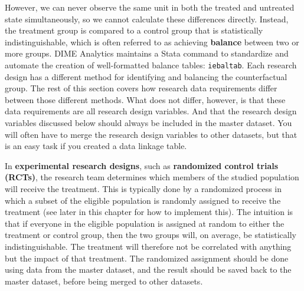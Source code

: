 However, we can never observe the same unit
in both the treated and untreated state simultaneously,
so we cannot calculate these differences directly.
Instead, the treatment group is compared to a control group
that is statistically indistinguishable,
which is often referred to as achieving
\textbf{balance} between two or more groups.
DIME Analytics maintains a Stata command to
standardize and automate the creation of well-formatted balance tables:
\texttt{iebaltab}.
Each research design has a different method for
identifying and balancing the counterfactual group.
The rest of this section covers how research data requirements
differ between those different methods.
What does not differ, however,
is that these data requirements are all research design variables.
And that the research design variables discussed below
should always be included in the master dataset.
You will often have to merge
the research design variables to other datasets,
but that is an easy task
if you created a data linkage table.


In \textbf{experimental research designs},
such as \textbf{randomized control trials (RCTs)},
the research team determines which members
of the studied population will receive the treatment.
This is typically done by a randomized process
in which a subset of the eligible population
is randomly assigned to receive the treatment
(see later in this chapter for how to implement this).
The intuition is that if everyone in the eligible population
is assigned at random to either the treatment or control group,
then the two groups will, on average, be statistically indistinguishable.
The treatment will therefore not be correlated with anything
but the impact of that treatment.
The randomized assignment should be done
using data from the master dataset,
and the result should be saved back to the master dataset,
before being merged to other datasets.


